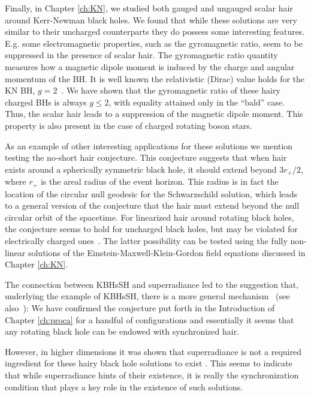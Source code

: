 \bigskip

Finally, in Chapter \ref{ch:KN}, we studied both gauged and ungauged scalar hair around Kerr-Newman black holes.
We found that while these solutions are very similar to their uncharged counterparts they do possess some interesting features.
E.g. some electromagnetic properties, such as the gyromagnetic ratio, seem to be suppressed in the presence of scalar hair.
The gyromagnetic ratio quantity measures how a magnetic dipole moment is induced by the charge and angular momentum of the BH.
It is well known the relativistic (Dirac) value holds for the KN BH, $g=2$~\cite{Carter:1968rr}.
We have shown that the gyromagnetic ratio of these hairy charged BHs is always $g\leqslant 2$, with equality attained only in the ``bald'' case.
Thus, the scalar hair leads to a suppression of the magnetic dipole moment.
This property is also present in the case of charged rotating boson stars.

As an example of other interesting applications for these solutions we mention testing the no-short hair conjecture.
This conjecture suggests that when hair exists around a spherically symmetric black hole, it should extend beyond $3r_+/2$, where $r_+$ is the areal radius of the event horizon\cite{Nunez:1996xv}.
This radius is in fact the location of the circular null geodesic for the Schwarzschild solution, which leads to a general version of the conjecture that the hair must extend beyond the null circular orbit of the spacetime\cite{Hod:2011aa}.
For linearized hair around rotating black holes, the conjecture seems to hold for uncharged black holes\cite{Hod:2016dkn}, but may be violated for electrically charged ones~\cite{Hod:2014sha,Hod:2015ynd}.
The latter possibility can be tested using the fully non-linear solutions of the Einstein-Maxwell-Klein-Gordon field equations discussed in Chapter \ref{ch:KN}.

\bigskip

The connection between KBHsSH and superradiance led to the suggestion that, underlying the example of KBHsSH, there is a more general mechanism~\cite{Herdeiro:2014goa,Herdeiro:2014ima} (see also~\cite{Herdeiro:2015waa,Herdeiro:2015gia}): 
We have confirmed the conjecture put forth in the Introduction of Chapter \ref{ch:proca} for a handful of configurations and essentially it seems that any rotating black hole can be endowed with synchronized hair.

However, in higher dimensions it was shown that superradiance is not a required ingredient for these hairy black hole solutions to exist \cite{Brihaye:2014nba,Herdeiro:2015kha}.
This seems to indicate that while superradiance hints of their existence, it is really the synchronization condition that plays a key role in the existence of such solutions.

